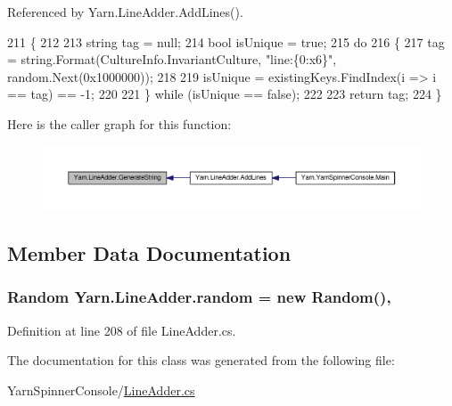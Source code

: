 Referenced by Yarn.\-Line\-Adder.\-Add\-Lines().


\begin{DoxyCode}
211                                                                 \{
212 
213             \textcolor{keywordtype}{string} tag = null;
214             \textcolor{keywordtype}{bool} isUnique = \textcolor{keyword}{true};
215             \textcolor{keywordflow}{do}
216             \{
217                 tag = string.Format(CultureInfo.InvariantCulture, \textcolor{stringliteral}{"line:\{0:x6\}"}, random.Next(0x1000000));
218 
219                 isUnique = existingKeys.FindIndex(i => i == tag) == -1;
220 
221             \} \textcolor{keywordflow}{while} (isUnique == \textcolor{keyword}{false});
222 
223             \textcolor{keywordflow}{return} tag;
224         \}
\end{DoxyCode}


Here is the caller graph for this function\-:
\nopagebreak
\begin{figure}[H]
\begin{center}
\leavevmode
\includegraphics[width=350pt]{a00122_a91ad68b679bd3b0bd89fe92ea5068688_icgraph}
\end{center}
\end{figure}




\subsection{Member Data Documentation}
\hypertarget{a00122_ad887744b1b813fc081be814958742c37}{
\subsubsection[{random}]{\setlength{\rightskip}{0pt plus 5cm}Random Yarn.\-Line\-Adder.\-random = new Random()\hspace{0.3cm}{\ttfamily [static]}, {\ttfamily [private]}}}\label{a00122_ad887744b1b813fc081be814958742c37}


Definition at line 208 of file Line\-Adder.\-cs.



The documentation for this class was generated from the following file\-:\begin{DoxyCompactItemize}
\item 
Yarn\-Spinner\-Console/\hyperlink{a00299}{Line\-Adder.\-cs}\end{DoxyCompactItemize}
